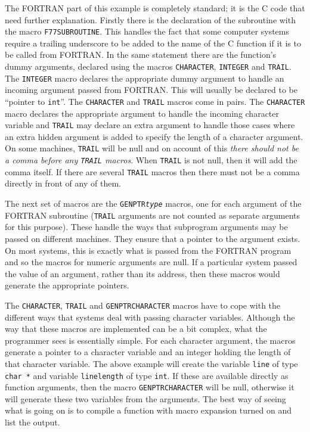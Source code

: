 \documentclass[twoside,11pt]{article}
\renewcommand{\_}{\texttt{\symbol{95}}}
\begin{document}
The FORTRAN part of this example is completely standard; it is the C code that
need further explanation. Firstly there is the declaration of the subroutine
with the macro \texttt{F77\_SUBROUTINE}\@. 
This handles the fact that some computer
systems require a trailing underscore to be added to the name of the C function
if it is to be called from FORTRAN\@. In the same statement there are the
function's dummy arguments, declared using the macros \texttt{CHARACTER}, 
\texttt{INTEGER} and \texttt{TRAIL}\@. 
The \texttt{INTEGER} macro declares the appropriate dummy argument to handle an
incoming argument passed from FORTRAN\@. This will usually be declared to be
``pointer to \texttt{int}''. The \texttt{CHARACTER} and \texttt{TRAIL} macros 
come in pairs. 
The \texttt{CHARACTER} macro declares the appropriate argument to handle the 
incoming character variable and \texttt{TRAIL} may declare an extra argument 
to handle those
cases where an extra hidden argument is added to specify the length of a
character argument. On some machines, \texttt{TRAIL} will be null and on 
account of this
\emph{there should not be a comma before any \texttt{TRAIL} macros}. 
When \texttt{TRAIL} is not
null, then it will add the comma itself. If there are several \texttt{TRAIL}
macros then there must not be a comma directly in front of any of them.

The next set of macros are the \texttt{GENPTR\_\textit{type}}\/ macros, one 
for each argument of the FORTRAN subroutine (\texttt{TRAIL} arguments are not 
counted as separate arguments for this purpose). 
These handle the ways that subprogram arguments
may be passed on different machines. They ensure that a pointer to the argument
exists. On most systems, this is exactly what is passed from the FORTRAN
program and so the macros for numeric arguments are null. If a particular
system passed the value of an argument, rather than its address, then these
macros would generate the appropriate pointers.

The \texttt{CHARACTER}, \texttt{TRAIL} and \texttt{GENPTR\_CHARACTER} macros 
have to cope with the different ways that systems deal with passing character 
variables. Although the
way that these macros are implemented can be a bit complex, what the programmer
sees is essentially simple. For each character argument, the macros generate a
pointer to a character variable and an integer holding the length of that
character variable. The above example will create the variable \texttt{line} of
type \texttt{char *} and variable \texttt{line\_length} of type \texttt{int}. 
If these are available directly as function arguments, then the macro
\texttt{GENPTR\_CHARACTER} will be null, otherwise it will generate these two 
variables from the arguments. 
The best way of seeing what is going on is to compile a
function with macro expansion turned on and list the output.
\end{document}
